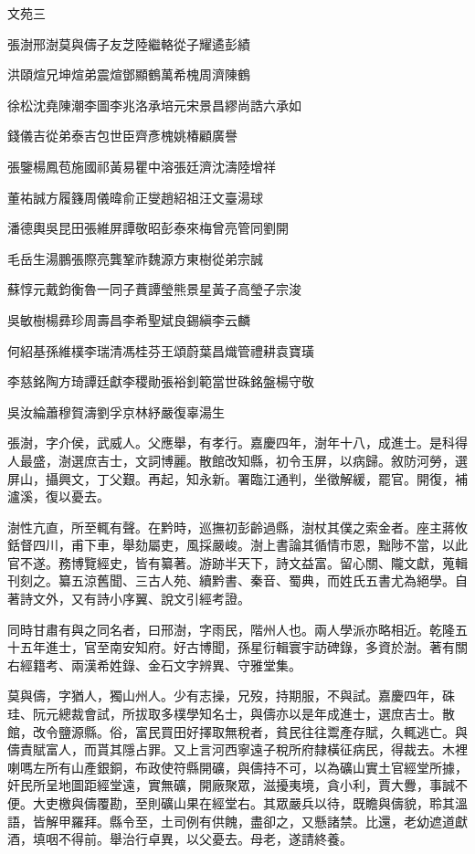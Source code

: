 
\begin{pinyinscope}
文苑三

張澍邢澍莫與儔子友芝陸繼輅從子耀遹彭績

洪頤煊兄坤煊弟震煊鄧顯鶴萬希槐周濟陳鶴

徐松沈堯陳潮李圖李兆洛承培元宋景昌繆尚誥六承如

錢儀吉從弟泰吉包世臣齊彥槐姚椿顧廣譽

張鑒楊鳳苞施國祁黃易瞿中溶張廷濟沈濤陸增祥

董祐誠方履籛周儀暐俞正燮趙紹祖汪文臺湯球

潘德輿吳昆田張維屏譚敬昭彭泰來梅曾亮管同劉開

毛岳生湯鵬張際亮龔鞏祚魏源方東樹從弟宗誠

蘇惇元戴鈞衡魯一同子蕡譚瑩熊景星黃子高瑩子宗浚

吳敏樹楊彞珍周壽昌李希聖斌良錫縝李云麟

何紹基孫維樸李瑞清馮桂芬王頌蔚葉昌熾管禮耕袁寶璜

李慈銘陶方琦譚廷獻李稷勛張裕釗範當世硃銘盤楊守敬

吳汝綸蕭穆賀濤劉孚京林紓嚴復辜湯生

張澍，字介侯，武威人。父應舉，有孝行。嘉慶四年，澍年十八，成進士。是科得人最盛，澍選庶吉士，文詞博麗。散館改知縣，初令玉屏，以病歸。敘防河勞，選屏山，攝興文，丁父艱。再起，知永新。署臨江通判，坐徵解緩，罷官。開復，補瀘溪，復以憂去。

澍性亢直，所至輒有聲。在黔時，巡撫初彭齡過縣，澍杖其僕之索金者。座主蔣攸銛督四川，甫下車，舉劾屬吏，風採嚴峻。澍上書論其循情市恩，黜陟不當，以此官不遂。務博覽經史，皆有纂著。游跡半天下，詩文益富。留心關、隴文獻，蒐輯刊刻之。纂五涼舊聞、三古人苑、續黔書、秦音、蜀典，而姓氏五書尤為絕學。自著詩文外，又有詩小序翼、說文引經考證。

同時甘肅有與之同名者，曰邢澍，字雨民，階州人也。兩人學派亦略相近。乾隆五十五年進士，官至南安知府。好古博聞，孫星衍輯寰宇訪碑錄，多資於澍。著有關右經籍考、兩漢希姓錄、金石文字辨異、守雅堂集。

莫與儔，字猶人，獨山州人。少有志操，兄歿，持期服，不與試。嘉慶四年，硃珪、阮元總裁會試，所拔取多樸學知名士，與儔亦以是年成進士，選庶吉士。散館，改令鹽源縣。俗，富民買田好擇取無稅者，貧民往往鬻產存賦，久輒逃亡。與儔責賦富人，而貰其隱占罪。又上言河西寧遠子稅所府隸橫征病民，得裁去。木裡喇嗎左所有山產銀銅，布政使符縣開礦，與儔持不可，以為礦山實土官經堂所據，奸民所呈地圖距經堂遠，實無礦，開廠聚眾，滋擾夷境，貪小利，賈大釁，事誠不便。大吏檄與儔覆勘，至則礦山果在經堂右。其眾嚴兵以待，既瞻與儔貌，聆其溫語，皆解甲羅拜。縣令至，土司例有供餽，盡卻之，又懸諸禁。比還，老幼遮道獻酒，填咽不得前。舉治行卓異，以父憂去。母老，遂請終養。


\end{pinyinscope}
